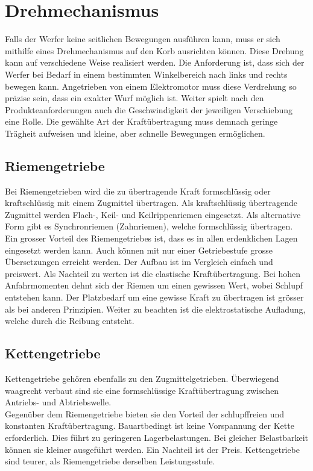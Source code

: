 ﻿\section{Drehmechanismus}
Falls der Werfer keine seitlichen Bewegungen ausführen kann, muss er sich mithilfe eines Drehmechanismus auf den Korb ausrichten können. Diese Drehung kann auf verschiedene Weise realisiert werden. Die Anforderung ist, dass sich der Werfer bei Bedarf in einem bestimmten Winkelbereich nach links und rechts bewegen kann. Angetrieben von einem Elektromotor muss diese Verdrehung so präzise sein, dass ein exakter Wurf möglich ist. Weiter spielt nach den Produkteanforderungen auch die Geschwindigkeit der jeweiligen Verschiebung eine Rolle. Die gewählte Art der Kraftübertragung muss demnach geringe Trägheit aufweisen und kleine, aber schnelle Bewegungen ermöglichen. 
 
\subsection{Riemengetriebe}
Bei Riemengetrieben wird die zu übertragende Kraft formschlüssig oder kraftschlüssig mit einem Zugmittel übertragen. Als kraftschlüssig übertragende Zugmittel werden Flach-, Keil- und Keilrippenriemen eingesetzt. Als alternative Form gibt es Synchronriemen (Zahnriemen), welche formschlüssig übertragen. \\
Ein grosser Vorteil des Riemengetriebes ist, dass es in allen erdenklichen Lagen eingesetzt werden kann. Auch können mit nur einer Getriebestufe grosse Übersetzungen erreicht werden. Der Aufbau ist im Vergleich einfach und preiswert. Als Nachteil zu werten ist die elastische Kraftübertragung. Bei hohen Anfahrmomenten dehnt sich der Riemen um einen gewissen Wert, wobei Schlupf entstehen kann. Der Platzbedarf um eine gewisse Kraft zu übertragen ist grösser als bei anderen Prinzipien. Weiter zu beachten ist die elektrostatische Aufladung, welche durch die Reibung entsteht. 
 
\subsection{Kettengetriebe}
Kettengetriebe gehören ebenfalls zu den Zugmittelgetrieben. Überwiegend waagrecht verbaut sind sie eine formschlüssige Kraftübertragung zwischen Antriebs- und Abtriebswelle. \\
Gegenüber dem Riemengetriebe bieten sie den Vorteil der schlupffreien und konstanten Kraftübertragung. Bauartbedingt ist keine Vorspannung der Kette erforderlich. Dies führt zu geringeren Lagerbelastungen. Bei gleicher Belastbarkeit können sie kleiner ausgeführt werden. Ein Nachteil ist der Preis. Kettengetriebe sind teurer, als Riemengetriebe derselben Leistungsstufe.


